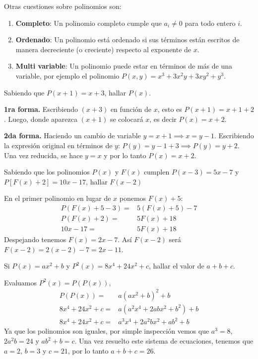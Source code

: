 Otras cuestiones sobre polinomios son:
\begin{enumerate}
    \item \textbf{Completo}: Un polinomio completo cumple que $a_i \neq 0$ para todo entero $i$.
    \item \textbf{Ordenado}: Un polinomio está ordenado si sus términos están escritos de manera decreciente (o creciente) respecto al exponente de $x$.
    \item \textbf{Multi variable}: Un polinomio puede estar en términos de más de una variable, por ejemplo el polinomio $P(x, y) = x^3 + 3x^2 y + 3xy^2 + y^3$.
\end{enumerate}

\begin{example}
    Sabiendo que $P(x + 1) = x + 3$, hallar $P(x)$.
\end{example}
\begin{solution}
    \textbf{1ra forma.} Escribiendo $(x + 3)$ en función de $x$, esto es $P(x + 1) = x + 1 + 2$.
    Luego, donde aparezca $(x + 1)$ se colocará $x$, es decir $P(x) = x + 2$.

    \textbf{2da forma.} Haciendo un cambio de variable $y = x + 1 \implies x = y - 1$.
    Escribiendo la expresión original en términos de $y$: $P(y) = y - 1 + 3 \implies P(y) = y + 2$.
    Una vez reducida, se hace $y = x$ y por lo tanto $P(x) = x + 2$.
\end{solution}

\begin{example}
    Sabiendo que los polinomios $P(x)$ y $F(x)$ cumplen $P(x - 3) = 5x - 7$ y $P[F(x) + 2] = 10x - 17$, hallar $F(x - 2)$
\end{example}
\begin{solution}
    En el primer polinomio en lugar de $x$ ponemos $F(x) + 5$:
    \begin{align*}
        P(F(x) + 5 - 3) =&  5 (F(x) + 5) - 7\\
        P(F(x) + 2) =& 5F(x) + 18\\
        10x - 17 =& 5F(x) + 18
    \end{align*}
    Despejando tenemos $F(x) = 2x - 7$.
    Así $F(x - 2)$ será $F(x - 2) = 2(x - 2) - 7 = \boxed{2x - 11}$.
\end{solution}

\begin{example}
    Si $P(x) = ax^2 + b$ y $P^2(x) = 8x^4 + 24x^2 + c$, hallar el valor de $a + b + c$.
\end{example}
\begin{solution}
    Evaluamos $P^2(x) = P(P(x))$,
    \begin{align*}
        P(P(x)) =& a (ax^2 + b)^2 + b\\
        8x^4 + 24x^2 + c =& a (a^2 x^4 + 2abx^2 + b^2) + b\\
        8x^4 + 24x^2 + c =& a^3 x^4 + 2a^2 bx^2 + ab^2 + b
    \end{align*}
    Ya que los polinomios son iguales, por simple inspección vemos que $a^3 = 8$, $2a^2 b = 24$ y $ab^2 + b = c$.
    Una vez resuelto este sistema de ecuaciones, tenemos que $a = 2$, $b = 3$ y $c = 21$, por lo tanto $a + b + c = 26$.
\end{solution}

